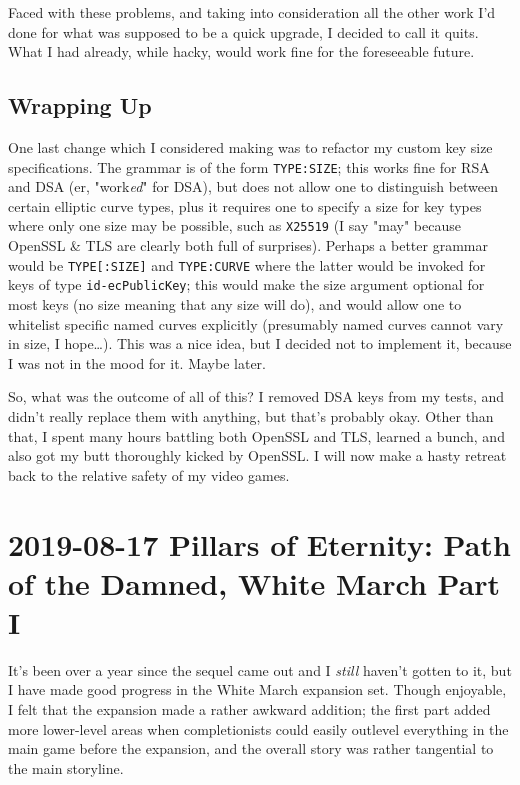 \documentclass{article}
\begin{document}
Faced with these problems, and taking into consideration all the other work I'd done for what was supposed to be a quick upgrade, I decided to call it quits.  What I had already, while hacky, would work fine for the foreseeable future.

\subsection{Wrapping Up}
One last change which I considered making was to refactor my custom key size specifications.  The grammar is of the form \texttt{TYPE:SIZE}; this works fine for RSA and DSA (er, "work\emph{ed}" for DSA), but does not allow one to distinguish between certain elliptic curve types, plus it requires one to specify a size for key types where only one size may be possible, such as \texttt{X25519} (I say "may" because OpenSSL \& TLS are clearly both full of surprises).  Perhaps a better grammar would be \verb|TYPE[:SIZE]| and \verb|TYPE:CURVE| where the latter would be invoked for keys of type \texttt{id-ecPublicKey}; this would make the size argument optional for most keys (no size meaning that any size will do), and would allow one to whitelist specific named curves explicitly (presumably named curves cannot vary in size, I hope\ldots).  This was a nice idea, but I decided not to implement it, because I was not in the mood for it.  Maybe later.

So, what was the outcome of all of this?  I removed DSA keys from my tests, and didn't really replace them with anything, but that's probably okay.  Other than that, I spent many hours battling both OpenSSL and TLS, learned a bunch, and also got my butt thoroughly kicked by OpenSSL.  I will now make a hasty retreat back to the relative safety of my video games.


\section{2019-08-17 Pillars of Eternity: Path of the Damned, White March Part I}
It's been over a year since the sequel came out and I \emph{still} haven't gotten to it, but I have made good progress in the White March expansion set.  Though enjoyable, I felt that the expansion made a rather awkward addition; the first part added more lower-level areas when completionists could easily outlevel everything in the main game before the expansion, and the overall story was rather tangential to the main storyline.
\end{document}

